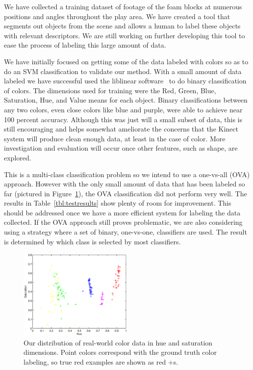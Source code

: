 \documentclass[11pt]{article}
\begin{document}
We have collected a training dataset of footage of the foam blocks at numerous
positions and angles throughout the play area. We have created a tool that
segments out objects from the scene and allows a human to label these objects
with relevant descriptors.  We are still working on further developing this
tool to ease the process of labeling this large amount of data.


We have initially focused on getting some of the data labeled with colors so as
to do an SVM classification to validate our method.  With a small amount of
data labeled we have successful used the liblinear software~\cite{LIBLINEAR} to do
binary classification of colors.  The dimensions used for training were the
Red, Green, Blue, Saturation, Hue, and Value means for each object.  Binary
classifications between any two colors, even close colors like blue and purple,
were able to achieve near 100 percent accuracy.  Although this was just will a
small subset of data, this is still encouraging and helps somewhat ameliorate
the concerns that the Kinect system will produce clean enough data, at least in
the case of color.  More investigation and evaluation will occur once other
features, such as shape, are explored.

This is a multi-class classification problem so we intend to use a one-vs-all
(OVA) approach.  However with the only small amount of data that has been
labeled so far (pictured in Figure~\ref{fig:colordata}), the OVA
classification did not perform very well. The results in Table~\ref{tbl:testresults} show plenty of room for improvement. This should
be addressed once we have a more efficient system for labeling the data
collected.  If the OVA approach still proves problematic, we are also
considering using a strategy where a set of binary, one-vs-one, classifiers are
used.  The result is determined by which class is selected by most classifiers.

\pagebreak
\begin{figure}
\centering
\includegraphics[height=1.75in]{figures/colorplot_noorange.eps}
\caption{Our distribution of real-world color data in hue and saturation
    dimensions. Point colors correspond with the ground truth color labeling,
    so true red examples are shown as red +s.}
\label{fig:colordata}
\end{figure}
\end{document}
